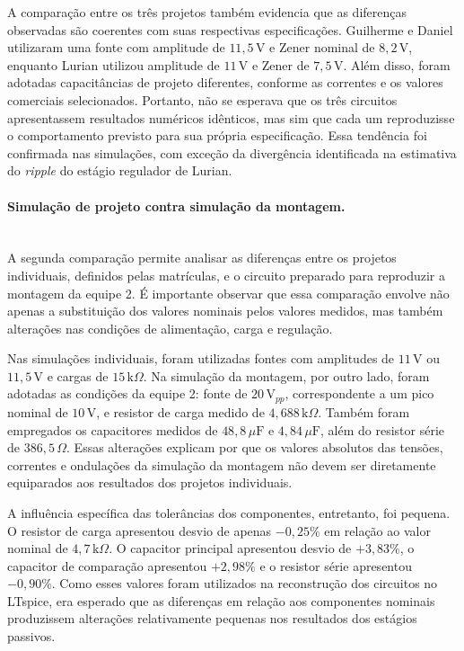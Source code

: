 \documentclass[11pt,a4paper]{article}
\begin{document}
A comparação entre os três projetos também evidencia que as diferenças observadas são coerentes com suas respectivas especificações. Guilherme e Daniel utilizaram uma fonte com amplitude de $11{,}5\,\text{V}$ e Zener nominal de $8{,}2\,\text{V}$, enquanto Lurian utilizou amplitude de $11\,\text{V}$ e Zener de $7{,}5\,\text{V}$. Além disso, foram adotadas capacitâncias de projeto diferentes, conforme as correntes e os valores comerciais selecionados. Portanto, não se esperava que os três circuitos apresentassem resultados numéricos idênticos, mas sim que cada um reproduzisse o comportamento previsto para sua própria especificação. Essa tendência foi confirmada nas simulações, com exceção da divergência identificada na estimativa do \textit{ripple} do estágio regulador de Lurian.

\paragraph{Simulação de projeto contra simulação da montagem.}\mbox{}\\

A segunda comparação permite analisar as diferenças entre os projetos individuais, definidos pelas matrículas, e o circuito preparado para reproduzir a montagem da equipe 2. É importante observar que essa comparação envolve não apenas a substituição dos valores nominais pelos valores medidos, mas também alterações nas condições de alimentação, carga e regulação.

Nas simulações individuais, foram utilizadas fontes com amplitudes de $11\,\text{V}$ ou $11{,}5\,\text{V}$ e cargas de $15\,\text{k}\Omega$. Na simulação da montagem, por outro lado, foram adotadas as condições da equipe 2: fonte de $20\,\text{V}_{pp}$, correspondente a um pico nominal de $10\,\text{V}$, e resistor de carga medido de $4{,}688\,\text{k}\Omega$. Também foram empregados os capacitores medidos de $48{,}8\,\mu\text{F}$ e $4{,}84\,\mu\text{F}$, além do resistor série de $386{,}5\,\Omega$. Essas alterações explicam por que os valores absolutos das tensões, correntes e ondulações da simulação da montagem não devem ser diretamente equiparados aos resultados dos projetos individuais.

A influência específica das tolerâncias dos componentes, entretanto, foi pequena. O resistor de carga apresentou desvio de apenas $-0{,}25\%$ em relação ao valor nominal de $4{,}7\,\text{k}\Omega$. O capacitor principal apresentou desvio de $+3{,}83\%$, o capacitor de comparação apresentou $+2{,}98\%$ e o resistor série apresentou $-0{,}90\%$. Como esses valores foram utilizados na reconstrução dos circuitos no LTspice, era esperado que as diferenças em relação aos componentes nominais produzissem alterações relativamente pequenas nos resultados dos estágios passivos.
\end{document}
